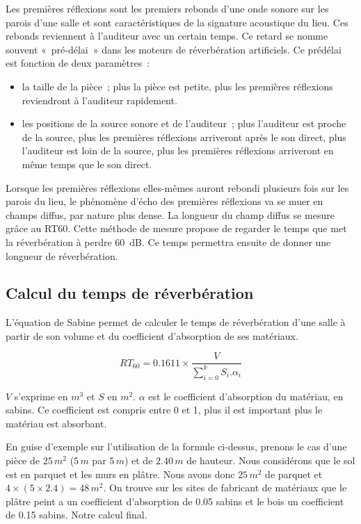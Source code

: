 \documentclass[
]{book}
\providecommand{\tightlist}{%
  \setlength{\itemsep}{0pt}\setlength{\parskip}{0pt}}
\begin{document}
Les premières réflexions sont les premiers rebonds d'une onde sonore sur les parois d'une salle et sont caractéristiques de la signature acoustique du lieu. Ces rebonds reviennent à l'auditeur avec un certain temps. Ce retard se nomme souvent «~pré-délai~» dans les moteurs de réverbération artificiels. Ce prédélai est fonction de deux paramètres~:

\begin{itemize}
\tightlist
\item
  la taille de la pièce~; plus la pièce est petite, plus les premières réflexions reviendront à l'auditeur rapidement.
\item
  les positions de la source sonore et de l'auditeur~; plus l'auditeur est proche de la source, plus les premières réflexions arriveront après le son direct, plus l'auditeur est loin de la source, plus les premières réflexions arriveront en même temps que le son direct.
\end{itemize}

Lorsque les premières réflexions elles-mêmes auront rebondi plusieurs fois sur les parois du lieu, le phénomène d'écho des premières réflexions va se muer en champs diffus, par nature plus dense. La longueur du champ diffus se mesure grâce au RT60. Cette méthode de mesure propose de regarder le temps que met la réverbération à perdre 60~dB. Ce temps permettra ensuite de donner une longueur de réverbération.

\hypertarget{calcul-du-temps-de-ruxe9verbuxe9ration}{%
\subsection{Calcul du temps de réverbération}\label{calcul-du-temps-de-ruxe9verbuxe9ration}}

L'équation de Sabine permet de calculer le temps de réverbération d'une salle à partir de son volume et du coefficient d'absorption de ses matériaux.

\[RT_{60} = 0.1611 \times \frac{V}{\sum_{i=0}^{k} S_i.\alpha_i}\]

\(V\) s'exprime en \(m^3\) et \(S\) en \(m^2\). \(\alpha\) est le coefficient d'absorption du matériau, en sabins. Ce coefficient est compris entre 0 et 1, plus il est important plus le matériau est absorbant.

En guise d'exemple sur l'utilisation de la formule ci-dessus, prenons le cas d'une pièce de \(25\,m^2\) (\(5\,m\) par \(5\,m\)) et de \(2.40\,m\) de hauteur. Nous considérons que le sol est en parquet et les murs en plâtre. Nous avons donc \(25\,m^2\) de parquet et \(4\times(5\times2.4)=48\,m^2\). On trouve sur les sites de fabricant de matériaux que le plâtre peint a un coefficient d'absorption de 0.05 sabins et le bois un coefficient de 0.15 sabins. Notre calcul final.
\end{document}
